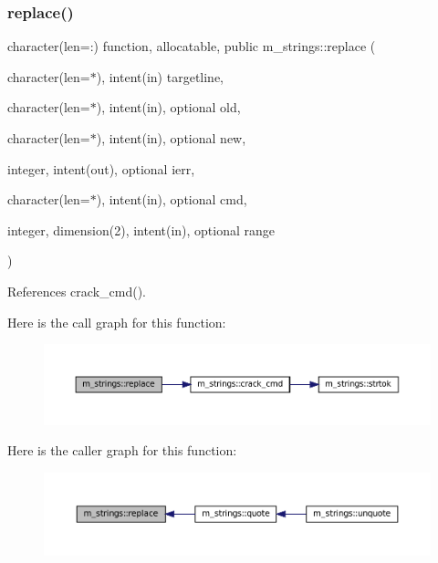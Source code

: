 \mbox{\label{namespacem__strings_ab5af73797bb08e7f654d39c9e8984ffe}} 
\subsubsection{\texorpdfstring{replace()}{replace()}}
{\footnotesize\ttfamily character(len=\+:) function, allocatable, public m\+\_\+strings\+::replace (\begin{DoxyParamCaption}\item[{character(len=$\ast$), intent(in)}]{targetline,  }\item[{character(len=$\ast$), intent(in), optional}]{old,  }\item[{character(len=$\ast$), intent(in), optional}]{new,  }\item[{integer, intent(out), optional}]{ierr,  }\item[{character(len=$\ast$), intent(in), optional}]{cmd,  }\item[{integer, dimension(2), intent(in), optional}]{range }\end{DoxyParamCaption})}



References crack\+\_\+cmd().

Here is the call graph for this function\+:
\nopagebreak
\begin{figure}[H]
\begin{center}
\leavevmode
\includegraphics[width=350pt]{namespacem__strings_ab5af73797bb08e7f654d39c9e8984ffe_cgraph}
\end{center}
\end{figure}
Here is the caller graph for this function\+:
\nopagebreak
\begin{figure}[H]
\begin{center}
\leavevmode
\includegraphics[width=350pt]{namespacem__strings_ab5af73797bb08e7f654d39c9e8984ffe_icgraph}
\end{center}
\end{figure}
\mbox{\label{namespacem__strings_ab3e5e7af9e9594fdb544f82736a26f17}} 
